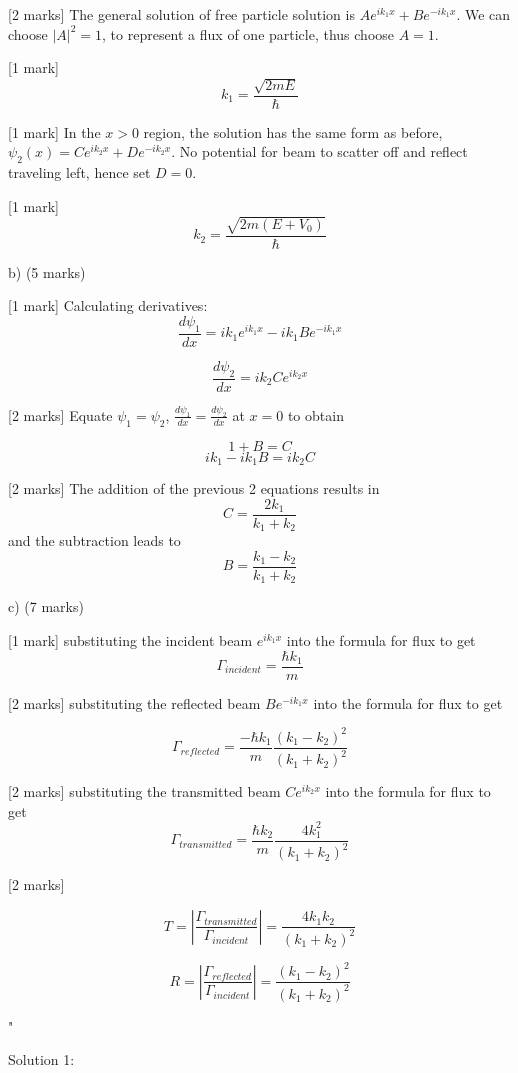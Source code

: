 [2 marks] The general solution of free particle solution is \( Ae^{ik_{1}x} + Be^{-ik_{1}x} \). We can choose \( |A|^{2} = 1 \), to represent a flux of one particle, thus choose \( A = 1 \). 

[1 mark] \[ k_1 = \frac{\sqrt{2mE}}{\hbar} \]

[1 mark] In the \( x > 0 \) region, the solution has the same form as before, \( \psi_{2}(x) = Ce^{ik_{2}x} + De^{-ik_{2}x} \). No potential for beam to scatter off and reflect traveling left, hence set \( D = 0 \). 

[1 mark] \[k_{2} = \frac{\sqrt{2m(E+V_0)}}{\hbar} \]

b) (5 marks)

[1 mark] Calculating derivatives:
\[ \frac{d\psi_1}{dx} = ik_{1}e^{ik_{1}x} - ik_{1}Be^{-ik_{1}x} \]

\[ \frac{d\psi_2}{dx} = ik_{2}Ce^{ik_{2}x} \]

[2 marks] Equate \( \psi_{1} = \psi_{2} \), \( \frac{d\psi_1}{dx} = \frac{d\psi_2}{dx} \) at \(x = 0\) to obtain

\[1 + B = C\]
\[ik_{1} - ik_{1}B = ik_{2}C\]

[2 marks] The addition of the previous 2 equations results in \[ C = \frac{2k_{1}}{k_{1}+k_{2}} \] and the subtraction leads to  \[ B = \frac{k_{1}-k_{2}}{k_{1}+k_{2}} \]

c) (7 marks)

[1 mark] substituting the incident beam \( e^{ik_{1}x} \) into the formula for flux to get \[\Gamma_{incident} = \frac{\hbar k_{1}}{m} \]

[2 marks] substituting the reflected beam \( Be^{-ik_{1}x} \) into the formula for flux to get 

\[ 
\Gamma_{reflected} = \frac{-\hbar k_{1}}{m}\frac{\left(k_{1} - k_{2} \right)^{2}}{ \left(k_{1} + k_{2} \right)^{2}} 
\]

[2 marks] substituting the transmitted beam \( Ce^{ik_{2}x} \) into the formula for flux to get \[\Gamma_{transmitted} = \frac{\hbar k_{2}}{m} \frac{4k_{1}^{2}}{ \left(k_{1} + k_{2} \right)^{2}} \]

[2 marks]

\[ T = \left|\frac{\Gamma_{transmitted}}{\Gamma_{incident}} \right| = \frac{4k_{1}k_{2}}{(k_{1}+k_{2})^{2}} \]

\[R = \left|\frac{\Gamma_{reflected}}{\Gamma_{incident}} \right| = \frac{(k_{1}-k_{2})^{2}}{(k_{1}+k_{2})^{2}} \]

"

Solution 1: 

